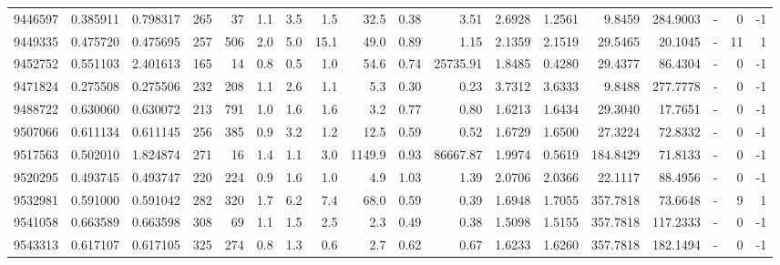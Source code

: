 \begin{tabular}{rrrrrrrrrrrrrrrlrr}
   9446597 & 0.385911 &   0.798317 &  265 &   37 &      1.1 &      3.5 &     1.5 &     32.5 &       0.38 &        3.51 &  2.6928 &  1.2561 &    9.8459 &  284.9003 &             - &        0 &         -1 \\
   9449335 & 0.475720 &   0.475695 &  257 &  506 &      2.0 &      5.0 &    15.1 &     49.0 &       0.89 &        1.15 &  2.1359 &  2.1519 &   29.5465 &   20.1045 &             - &       11 &          1 \\
   9452752 & 0.551103 &   2.401613 &  165 &   14 &      0.8 &      0.5 &     1.0 &     54.6 &       0.74 &    25735.91 &  1.8485 &  0.4280 &   29.4377 &   86.4304 &             - &        0 &         -1 \\
   9471824 & 0.275508 &   0.275506 &  232 &  208 &      1.1 &      2.6 &     1.1 &      5.3 &       0.30 &        0.23 &  3.7312 &  3.6333 &    9.8488 &  277.7778 &             - &        0 &         -1 \\
   9488722 & 0.630060 &   0.630072 &  213 &  791 &      1.0 &      1.6 &     1.6 &      3.2 &       0.77 &        0.80 &  1.6213 &  1.6434 &   29.3040 &   17.7651 &             - &        0 &         -1 \\
   9507066 & 0.611134 &   0.611145 &  256 &  385 &      0.9 &      3.2 &     1.2 &     12.5 &       0.59 &        0.52 &  1.6729 &  1.6500 &   27.3224 &   72.8332 &             - &        0 &         -1 \\
   9517563 & 0.502010 &   1.824874 &  271 &   16 &      1.4 &      1.1 &     3.0 &   1149.9 &       0.93 &    86667.87 &  1.9974 &  0.5619 &  184.8429 &   71.8133 &             - &        0 &         -1 \\
   9520295 & 0.493745 &   0.493747 &  220 &  224 &      0.9 &      1.6 &     1.0 &      4.9 &       1.03 &        1.39 &  2.0706 &  2.0366 &   22.1117 &   88.4956 &             - &        0 &         -1 \\
   9532981 & 0.591000 &   0.591042 &  282 &  320 &      1.7 &      6.2 &     7.4 &     68.0 &       0.59 &        0.39 &  1.6948 &  1.7055 &  357.7818 &   73.6648 &             - &        9 &          1 \\
   9541058 & 0.663589 &   0.663598 &  308 &   69 &      1.1 &      1.5 &     2.5 &      2.3 &       0.49 &        0.38 &  1.5098 &  1.5155 &  357.7818 &  117.2333 &             - &        0 &         -1 \\
   9543313 & 0.617107 &   0.617105 &  325 &  274 &      0.8 &      1.3 &     0.6 &      2.7 &       0.62 &        0.67 &  1.6233 &  1.6260 &  357.7818 &  182.1494 &             - &        0 &         -1 \\

\end{tabular}
